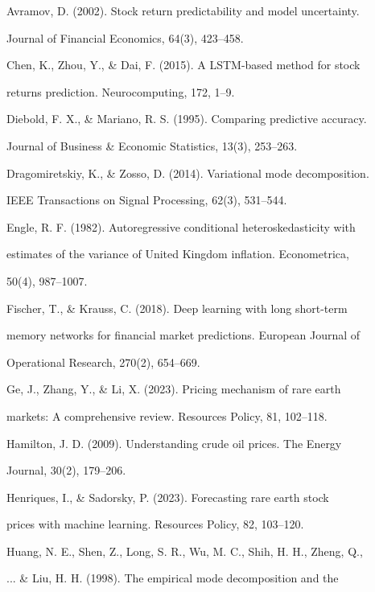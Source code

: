 Avramov, D. (2002). Stock return predictability and model uncertainty.

Journal of Financial Economics, 64(3), 423--458.



Chen, K., Zhou, Y., \& Dai, F. (2015). A LSTM-based method for stock

returns prediction. Neurocomputing, 172, 1--9.



Diebold, F. X., \& Mariano, R. S. (1995). Comparing predictive accuracy.

Journal of Business \& Economic Statistics, 13(3), 253--263.



Dragomiretskiy, K., \& Zosso, D. (2014). Variational mode decomposition.

IEEE Transactions on Signal Processing, 62(3), 531--544.



Engle, R. F. (1982). Autoregressive conditional heteroskedasticity with

estimates of the variance of United Kingdom inflation. Econometrica,

50(4), 987--1007.



Fischer, T., \& Krauss, C. (2018). Deep learning with long short-term

memory networks for financial market predictions. European Journal of

Operational Research, 270(2), 654--669.



Ge, J., Zhang, Y., \& Li, X. (2023). Pricing mechanism of rare earth

markets: A comprehensive review. Resources Policy, 81, 102--118.



Hamilton, J. D. (2009). Understanding crude oil prices. The Energy

Journal, 30(2), 179--206.



Henriques, I., \& Sadorsky, P. (2023). Forecasting rare earth stock

prices with machine learning. Resources Policy, 82, 103--120.



Huang, N. E., Shen, Z., Long, S. R., Wu, M. C., Shih, H. H., Zheng, Q.,

... \& Liu, H. H. (1998). The empirical mode decomposition and the

